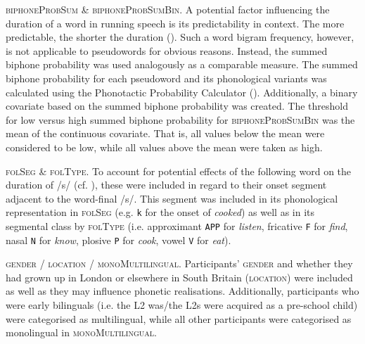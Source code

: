 \textsc{biphoneProbSum} \& \textsc{biphoneProbSumBin}. A potential factor influencing the duration of a word in running speech is its predictability in context. The more predictable, the shorter the duration (\cite{Pluymaekers2005a, Bell2009, Torreira2009}). Such a word bigram frequency, however, is not applicable to pseudowords for obvious reasons. Instead, the summed biphone probability was used analogously as a comparable measure. The summed biphone probability for each pseudoword and its phonological variants was calculated using the Phonotactic Probability Calculator (\cite{Vitevitch2004}). Additionally, a binary covariate based on the summed biphone probability was created. The threshold for low versus high summed biphone probability for \textsc{biphoneProbSumBin} was the mean of the continuous covariate. That is, all values below the mean were considered to be low, while all values above the mean were taken as high.

\textsc{folSeg} \& \textsc{folType}. To account for potential effects of the following word on the duration of /s/ (cf. \cite{Klatt1976, Umeda1977}), these were included in regard to their onset segment adjacent to the word-final /s/. This segment was included in its phonological representation in \textsc{folSeg} (e.g. \texttt{k} for the onset of \textit{cooked}) as well as in its segmental class by \textsc{folType} (i.e. approximant \texttt{APP} for \textit{listen}, fricative \texttt{F} for \textit{find}, nasal \texttt{N} for \textit{know}, plosive \texttt{P} for \textit{cook}, vowel \texttt{V} for \textit{eat}).

\textsc{gender} / \textsc{location} / \textsc{monoMultilingual}. Participants’ \textsc{gender} and whether they had grown up in London or elsewhere in South Britain (\textsc{location}) were included as well as they may influence phonetic realisations. Additionally, participants who were early bilinguals (i.e. the L2 was/the L2s were acquired as a pre-school child) were categorised as multilingual, while all other participants were categorised as monolingual in \textsc{monoMultilingual}.

